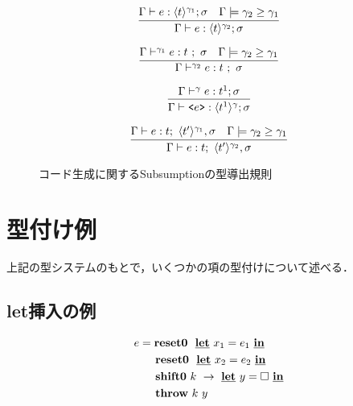 \begin{figure}[H]
  \centering
  \[
    \infer
    {\Gamma \vdash e : \codeT{t}{\gamma_2} ; \sigma}
    {\Gamma \vdash e : \codeT{t}{\gamma_1} ; \sigma
      & \Gamma \models \gamma_2 \ord \gamma_1
    }
  \]

  \[
    \infer
    {\Gamma \vdash^{\gamma_2} e : t ~;~ \sigma}
    {\Gamma \vdash^{\gamma_1} e : t ~;~ \sigma
      & \Gamma \models \gamma_2 \ord \gamma_1
    }
  \]


  \[
    \infer
    {\Gamma \vdash \code{e} : \codeT{t^1}{\gamma} ; \sigma}
    {\Gamma \vdash^{\gamma} e : t^1 ; \sigma}
  \]

  \[
    \infer
    {\Gamma \vdash e : t;~\codeT{t'}{\gamma_2},\sigma}
    {\Gamma \vdash e : t;~\codeT{t'}{\gamma_1},\sigma
      & \Gamma \models \gamma_2 \ord \gamma_1
    }
  \]

  \caption{コード生成に関するSubsumptionの型導出規則}
  \label{fig:code_gen_subs_type_rule}
\end{figure}
\hrulefill


\section{型付け例}

上記の型システムのもとで，いくつかの項の型付けについて述べる．

\subsection{let挿入の例}
\label{subsec:exam-let}


\begin{align*}
  e & = \textbf{reset0} ~~\underline{\textbf{let}}~x_1= e_1 ~\underline{\textbf{in}} \\
    & \phantom{=}~~ \textbf{reset0} ~~\underline{\textbf{let}}~x_2= e_2~\underline{\textbf{in}} \\
    & \phantom{=}~~ \textbf{shift0}~k~\to~\underline{\textbf{let}}~y=\Box~\underline{\textbf{in}} \\
    & \phantom{=}~~ \textbf{throw}~ k~ y
\end{align*}

